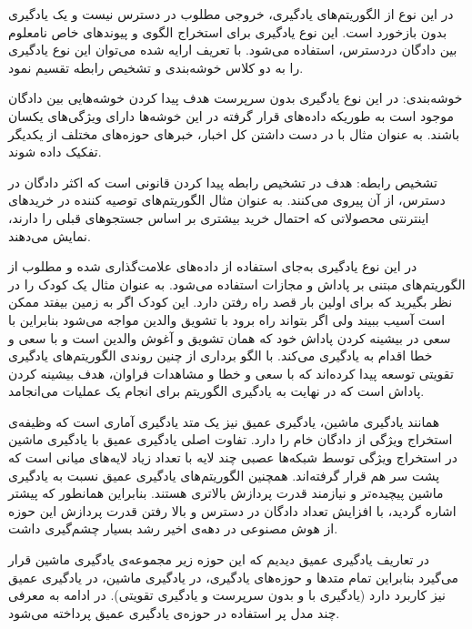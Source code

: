 در این نوع از الگوریتم‌های یادگیری، خروجی مطلوب در دسترس نیست و یک یادگیری بدون بازخورد است. این نوع یادگیری برای استخراج الگوی و پیوندهای خاص نامعلوم بین دادگان دردسترس، استفاده می‌شود. با تعریف ارایه شده می‌توان این نوع یادگیری را به دو کلاس خوشه‌بندی و تشخیص رابطه تقسیم نمود.

 خوشه‌بندی: در این نوع یادگیری بدون سرپرست هدف پیدا کردن خوشه‌هایی بین دادگان موجود است به ‌طوریکه داده‌های قرار گرفته در این خوشه‌ها دارای ویژگی‌های یکسان باشند. به عنوان مثال با در دست داشتن کل اخبار، خبر‌های حوزه‌های مختلف از یکدیگر تفکیک داده شوند.

 تشخیص رابطه: هدف در تشخیص رابطه پیدا کردن قانونی است که اکثر دادگان در دسترس، از آن پیروی می‌کنند. به عنوان مثال الگوریتم‌های توصیه کننده در خرید‌های اینترنتی محصولاتی که احتمال خرید بیشتری بر اساس جستجوهای قبلی را دارند، نمایش می‌دهند.

در این نوع یادگیری به‌جای استفاده از داده‌های علامت‌گذاری شده و مطلوب از الگوریتم‌های مبتنی بر پاداش و مجازات استفاده می‌شود. به عنوان مثال یک کودک را در نظر بگیرید که برای اولین بار قصد راه رفتن دارد. این کودک اگر به زمین بیفتد ممکن است آسیب ببیند ولی اگر بتواند راه برود با تشویق والدین مواجه می‌شود بنابراین با سعی در بیشینه کردن پاداش خود که همان تشویق و آغوش والدین است و با سعی و خطا اقدام به یادگیری می‌کند. با الگو برداری از چنین روندی الگوریتم‌های یادگیری تقویتی توسعه پیدا کرده‌اند که با سعی و خطا و مشاهدات فراوان، هدف بیشینه کردن پاداش است که در نهایت به یادگیری الگوریتم برای انجام یک عملیات می‌انجامد. 

همانند یادگیری ماشین، یادگیری عمیق نیز یک متد یادگیری آماری است که وظیفه‌ی استخراج ویژگی از دادگان خام را دارد. تفاوت اصلی یادگیری عمیق با یادگیری ماشین در استخراج ویژگی توسط شبکه‌ها عصبی چند لایه با تعداد زیاد لایه‌های میانی است که پشت سر هم قرار گرفته‌اند. همچنین الگوریتم‌های یادگیری عمیق نسبت به یادگیری ماشین پیچیده‌تر و نیازمند قدرت پردازش بالاتری هستند. بنابراین همانطور که پیشتر اشاره گردید، با افزایش تعداد دادگان در دسترس و بالا رفتن قدرت پردازش این حوزه از هوش مصنوعی در دهه‌ی اخیر رشد بسیار چشم‌گیری داشت.

در تعاریف یادگیری عمیق دیدیم که این حوزه زیر مجموعه‌ی یادگیری ماشین قرار می‌گیرد بنابراین تمام متدها و حوزه‌های یادگیری، در یادگیری ماشین، در یادگیری عمیق نیز کاربرد دارد (یادگیری با و بدون سرپرست و یادگیری تقویتی). در ادامه به معرفی چند مدل پر استفاده در حوزه‌ی یادگیری عمیق پرداخته می‌شود.

